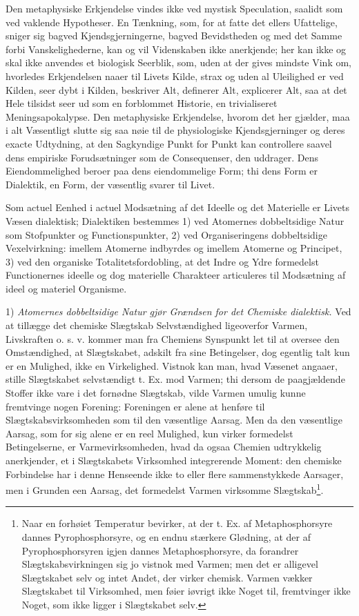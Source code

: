 \documentclass[12pt,a4paper]{book}
\begin{document}
Den metaphysiske Erkjendelse vindes ikke ved mystisk Speculation,
saalidt som ved vaklende Hypotheser. En Tænkning, som, for at fatte
det ellers Ufattelige, sniger sig bagved Kjendsgjerningerne, bagved
Bevidstheden og med det Samme forbi Vanskelighederne, kan og vil
Videnskaben ikke anerkjende; her kan ikke og skal ikke anvendes et
biologisk Seerblik, som, uden at der gives mindste Vink om,
hvorledes Erkjendelsen naaer til Livets Kilde, strax og uden al
Uleilighed er ved Kilden, seer dybt i Kilden, beskriver Alt,
definerer Alt, explicerer Alt, saa at det Hele tilsidst seer ud som
en forblommet Historie, en trivialiseret Meningsapokalypse. Den
metaphysiske Erkjendelse, hvorom det her gjælder, maa i alt
Væsentligt slutte sig saa nøie til de physiologiske
Kjendsgjerninger og deres exacte Udtydning, at den Sagkyndige Punkt
for Punkt kan controllere saavel dens empiriske Forudsætninger som
de Consequenser, den uddrager. Dens Eiendommelighed beroer paa dens
eiendommelige Form; thi dens Form er Dialektik, en Form, der
væsentlig svarer til Livet.

Som actuel Eenhed i actuel Modsætning af det Ideelle og det
Materielle er Livets Væsen dialektisk; Dialektiken bestemmes 1) ved
Atomernes dobbeltsidige Natur som Stofpunkter og Functionspunkter,
2) ved Organiseringens dobbeltsidige Vexelvirkning: imellem
Atomerne indbyrdes og imellem Atomerne og Principet, 3) ved den
organiske Totalitetsfordobling, at det Indre og Ydre formedelst
Functionernes ideelle og dog materielle Charakteer articuleres til
Modsætning af ideel og materiel Organisme.

1) \emph{Atomernes dobbeltsidige Natur gjør Grændsen for det
Chemiske dialektisk.} Ved at tillægge det chemiske Slægtskab
Selvstændighed ligeoverfor Varmen, Livskraften o. s. v. kommer man
fra Chemiens Synspunkt let til at oversee den Omstændighed, at
Slægtskabet, adskilt fra sine Betingelser, dog
\setcounter{footnote}{0}
egentlig talt kun er en Mulighed, ikke en Virkelighed. Vistnok kan
man, hvad Væsenet angaaer, stille Slægtskabet selvstændigt t. Ex.
mod Varmen; thi dersom de paagjældende Stoffer ikke vare i det
fornødne Slægtskab, vilde Varmen umulig kunne fremtvinge nogen
Forening: Foreningen er alene at henføre til
Slægtskabsvirksomheden som til den væsentlige Aarsag. Men da den
væsentlige Aarsag, som for sig alene er en reel Mulighed, kun
virker formedelst Betingelserne, er Varmevirksomheden, hvad da
ogsaa Chemien udtrykkelig anerkjender, et i Slægtskabets
Virksomhed integrerende Moment: den chemiske Forbindelse har i
denne Henseende ikke to eller flere sammenstykkede Aarsager, men i
Grunden een Aarsag, det formedelst Varmen virksomme
Slægtskab\footnote{Naar en forhøiet Temperatur bevirker, at der
t. Ex. af Metaphosphorsyre dannes Pyrophosphorsyre, og en endnu
stærkere Glødning, at der af Pyrophosphorsyren igjen dannes
Metaphosphorsyre, da forandrer Slægtskabsvirkningen sig jo vistnok
med Varmen; men det er alligevel Slægtskabet selv og intet Andet,
der virker chemisk. Varmen vækker Slægtskabet til Virksomhed, men
føier iøvrigt ikke Noget til, fremtvinger ikke Noget, som ikke
ligger i Slægtskabet selv.}.
\end{document}
